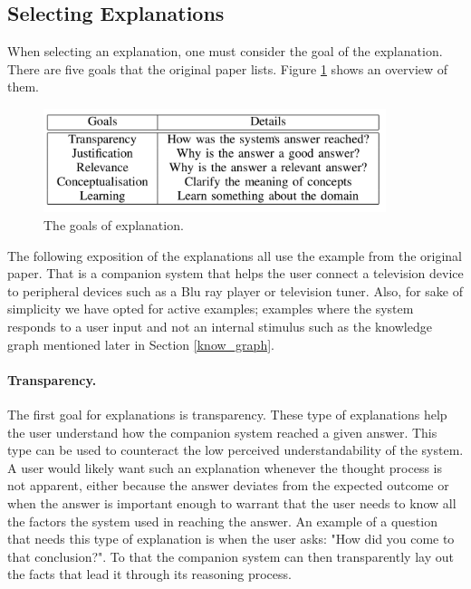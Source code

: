 \documentclass[a4paper]{article}
\begin{document}
\subsection{Selecting Explanations}

When selecting an explanation, one must consider the goal of the explanation. There are five goals that the original paper lists. Figure \ref{fig:goals} shows an overview of them.

\begin{figure}[H]
	\centering
	\includegraphics[width=10cm]{goals.png}
	\caption{The goals of explanation.}
	\label{fig:goals}
\end{figure}

The following exposition of the explanations all use the example from the original paper. That is a companion system that helps the user connect a television device to peripheral devices such as a Blu ray player or television tuner. Also, for sake of simplicity we have opted for active examples; examples where the system responds to a user input and not an internal stimulus such as the knowledge graph mentioned later in Section \ref{know_graph}.

\paragraph{Transparency.} The first goal for explanations is transparency. These type of explanations help the user understand how the companion system reached a given answer. This type can be used to counteract the low perceived understandability of the system. A user would likely want such an explanation whenever the thought process is not apparent, either because the answer deviates from the expected outcome or when the answer is important enough to warrant that the user needs to know all the factors the system used in reaching the answer. An example of a question that needs this type of explanation is when the user asks: "How did you come to that conclusion?". To that the companion system can then transparently lay out the facts that lead it through its reasoning process.
\end{document}
